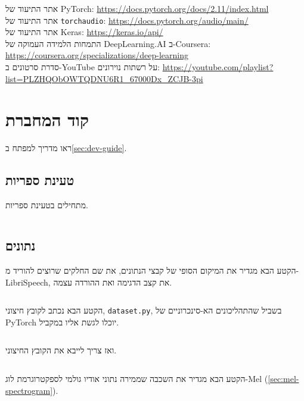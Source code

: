 \documentclass[hebrew, a4paper]{article}
\theoremstyle{plain}
\theoremstyle{definition}
\numberwithin{equation}{section}
\begin{document}
אתר התיעוד של PyTorch: \url{https://docs.pytorch.org/docs/2.11/index.html}\\
אתר התיעוד של \verb|torchaudio|: \url{https://docs.pytorch.org/audio/main/}\\
אתר התיעוד של Keras: \url{https://keras.io/api/}\\
התמחות הלמידה העמוקה של DeepLearning.AI ב-Coursera: \url{https://coursera.org/specializations/deep-learning}\\
סדרת סרטונים ב-YouTube על רשתות נוירונים: \url{https://youtube.com/playlist?list=PLZHQObOWTQDNU6R1_67000Dx_ZCJB-3pi}

\cleardoublepage

{}
\listoffigures

{}
\listoflistings

{}
\listoftables

\appendix

\section{קוד המחברת}
\label{sec:code}

ראו מדריך למפתח ב\autoref{sec:dev-guide}.

\subsection{טעינת ספריות}
\label{sec:code-libraries}

מתחילים בטעינת ספריות.
\inputminted{python}{snippets/Notebook/01-libraries.py}

\subsection{נתונים}
\label{sec:code-datasets}

הקטע הבא מגדיר את המיקום הסופי של קבצי הנתונים, את שם החלקים שרוצים
להוריד מ-LibriSpeech, את קצב הדגימה ואת ההורדה עצמה.
\inputminted{python}{snippets/Notebook/02-download-utils.py}

הקטע הבא נכתב לקובץ חיצוני, \verb|dataset.py|, בשביל שהתהליכונים
הא-סינכרוניים של PyTorch יוכלו לגשת אליו במקביל.
\inputminted{python}{snippets/Notebook/03-dataset.py}
ואז צריך לייבא את הקובץ החיצוני.
\inputminted{python}{snippets/Notebook/04-dataset-import.py}

הקטע הבא מגדיר את השכבה שממירה נתוני אודיו גולמי לספקטרוגרמת לוג-Mel
(\autoref{sec:mel-spectrogram}).
\inputminted{python}{snippets/Notebook/05-spectro.py}
\end{document}
